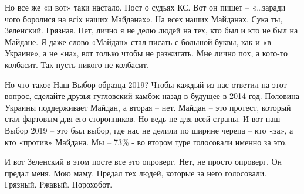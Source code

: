 Но все же «и вот» таки настало. Пост о судьях КС. Вот он пишет – «…заради чого
боролися на всіх наших Майданах». На всех наших Майданах. Сука ты, Зеленский.
Грязная. Нет, лично я не делю людей на тех, кто был и кто не был на Майдане. Я
даже слово «Майдан» стал писать с большой буквы, как и «в Украине», а не «на»,
вот только чтобы не разжигать. Мне лично пох, а кого-то колбасит. Так пусть
никого не колбасит.

Но что такое Наш Выбор образца 2019? Чтобы каждый из нас ответил на этот
вопрос, сделайте друзья гугловский камбэк назад в будущее в 2014 год. Половина
Украины поддерживает Майдан, а вторая – нет. Майдан – это протест, который стал
фартовым для его сторонников. Но ведь не для всей страны. И вот наш Выбор 2019
– это был выбор, где нас не делили по ширине черепа – кто «за», а кто «против»
Майдана. Мы – 73\% - во втором туре голосовали именно за это.

И вот Зеленский в этом посте все это опроверг. Нет, не просто опроверг. Он
предал меня. Мою маму. Предал тех людей, которые за него голосовали. Грязный.
Ржавый. Порохобот.

